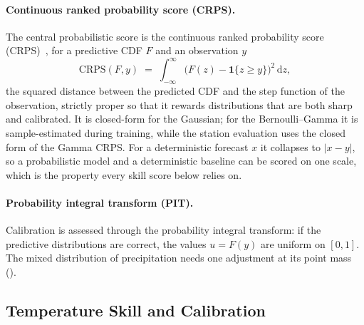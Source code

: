 \paragraph*{Continuous ranked probability score (CRPS).}
The central probabilistic score is the continuous ranked probability score (CRPS)~\cite{gneiting2007scoring}, for a predictive CDF $F$ and an observation $y$
\begin{equation}
    \mathrm{CRPS}(F, y) \;=\; \int_{-\infty}^{\infty} \bigl( F(z) - \mathbf{1}\{z \geq y\} \bigr)^{2} \,\mathrm{d}z ,
    \label{eq:crps}
\end{equation}
the squared distance between the predicted CDF and the step function of the observation, strictly proper so that it rewards distributions that are both sharp and calibrated. It is closed-form for the Gaussian; for the Bernoulli--Gamma it is sample-estimated during training, while the station evaluation uses the closed form of the Gamma CRPS. For a deterministic forecast $x$ it collapses to $\lvert x - y \rvert$, so a probabilistic model and a deterministic baseline can be scored on one scale, which is the property every skill score below relies on.

\paragraph*{Probability integral transform (PIT).}
Calibration is assessed through the probability integral transform: if the predictive distributions are correct, the values $u = F(y)$ are uniform on $[0,1]$. The mixed distribution of precipitation needs one adjustment at its point mass ().

\subsection{Temperature Skill and Calibration}\label{subsec:app-skill-tmax}

